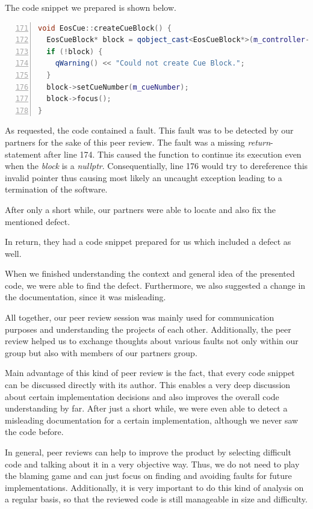 \documentclass{scrreprt}
\begin{document}
The code snippet we prepared is shown below.

\bigskip
\begin{lstlisting}[language=C++,
					numbers=left,
					firstnumber=171,
					directivestyle={\color{black}}
					emph={int,char,double,float,unsigned},
					emphstyle={\color{blue}}]
void EosCue::createCueBlock() {
  EosCueBlock* block = qobject_cast<EosCueBlock*>(m_controller->blockManager()->addNewBlock("Eos Cue"));
  if (!block) {
    qWarning() << "Could not create Cue Block.";
  }
  block->setCueNumber(m_cueNumber);
  block->focus();
}
\end{lstlisting}
\bigskip

As requested, the code contained a fault. This fault was to be detected by our partners for the sake of this peer review.
The fault was a missing \emph{return}-statement after line 174. This caused the function to continue its execution even when the \emph{block} is a \emph{nullptr}. Consequentially, line 176 would try to dereference this invalid pointer thus causing most likely an uncaught exception leading to a termination of the software.

After only a short while, our partners were able to locate and also fix the mentioned defect.

In return, they had a code snippet prepared for us which included a defect as well. 


When we finished understanding the context and general idea of the presented code, we were able to find the defect. Furthermore, we also suggested a change in the documentation, since it was misleading.

All together, our peer review session was mainly used for communication purposes and understanding the projects of each other. Additionally, the peer review helped us to exchange thoughts about various faults not only within our group but also with members of our partners group.

Main advantage of this kind of peer review is the fact, that every code snippet can be discussed directly with its author. This enables a very deep discussion about certain implementation decisions and also improves the overall code understanding by far. After just a short while, we were even able to detect a misleading documentation for a certain implementation, although we never saw the code before. 

In general, peer reviews can help to improve the product by selecting difficult code and talking about it in a very objective way. Thus, we do not need to play the blaming game and can just focus on finding and avoiding faults for future implementations. Additionally, it is very important to do this kind of analysis on a regular basis, so that the reviewed code is still manageable in size and difficulty. 
\end{document}
